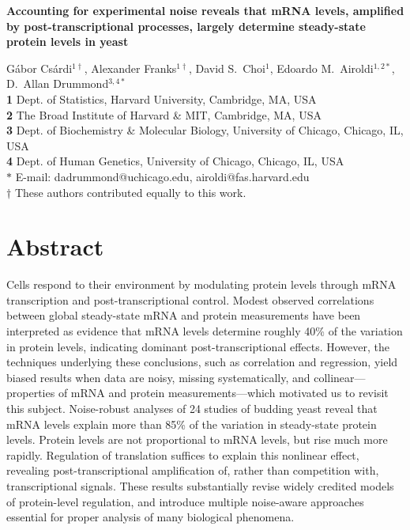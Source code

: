 \documentclass[10pt]{article}
\date{}
\begin{document}
\begin{flushleft}
{\Large
\textbf{Accounting for experimental noise reveals that mRNA levels, amplified by post-transcriptional processes, largely determine steady-state protein levels in yeast}
}

\medskip
G\'abor Cs\'ardi$^{1\dagger}$, 
Alexander Franks$^{1\dagger}$, 
David S.~Choi$^{1}$,
Edoardo M.~Airoldi$^{1,2\ast}$,
D.~Allan Drummond$^{3,4\ast}$
\\
\textbf{1} Dept. of Statistics, Harvard University, Cambridge, MA, USA
\\
\textbf{2} The Broad Institute of Harvard \& MIT, Cambridge, MA, USA
\\
\textbf{3} Dept. of Biochemistry \& Molecular Biology, University of Chicago, Chicago, IL, USA
\\
\textbf{4} Dept. of Human Genetics, University of Chicago, Chicago, IL, USA
\\
$\ast$ E-mail: dadrummond@uchicago.edu, airoldi@fas.harvard.edu\\
$\dagger$ These authors contributed equally to this work.
\end{flushleft}

\section*{Abstract}
Cells respond to their environment by modulating protein levels
through mRNA transcription and post-transcriptional control. Modest observed
correlations between global steady-state mRNA and protein measurements
have been interpreted as evidence that mRNA levels determine
roughly 40\% of the variation in protein levels, indicating dominant
post-transcriptional effects. However, the techniques underlying these
conclusions, such as correlation and regression, yield biased results
when data are noisy, missing systematically, and collinear---properties
of mRNA and protein measurements---which motivated us to revisit this
subject. Noise-robust analyses of 24 studies of budding yeast reveal
that mRNA levels explain more than 85\% of the variation in steady-state
protein levels. Protein levels are not proportional to mRNA levels, but rise much more rapidly. Regulation of translation suffices to explain this nonlinear effect, revealing post-transcriptional amplification of, rather than competition with, transcriptional signals. These results substantially revise widely credited models of protein-level regulation, and introduce multiple noise-aware approaches essential for proper analysis of many biological phenomena.
\end{document}
